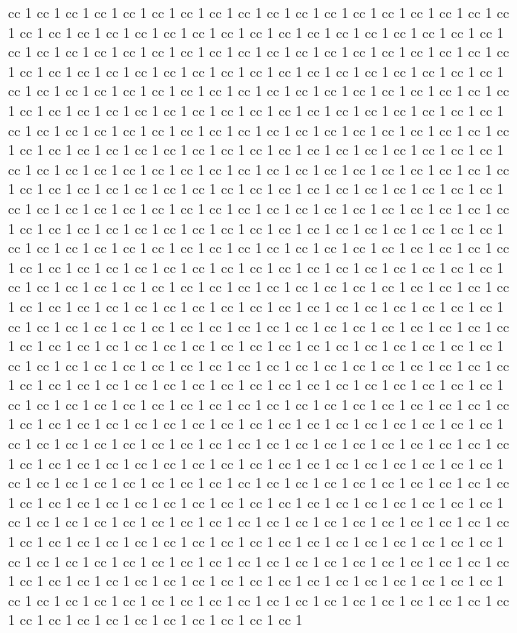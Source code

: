 \documentclass[11pt]{article}
\begin{document}
\begin{itemize}
 cc 1  cc 1  cc 1  cc 1  cc 1  cc 1  cc 1  cc 1  cc 1  cc 1  cc 1  cc 1  cc 1  cc 1  cc 1  cc 1  cc 1  cc 1  cc 1  cc 1  cc 1  cc 1  cc 1  cc 1  cc 1  cc 1  cc 1  cc 1  cc 1  cc 1  cc 1  cc 1  cc 1  cc 1  cc 1  cc 1  cc 1  cc 1  cc 1  cc 1  cc 1  cc 1  cc 1  cc 1  cc 1  cc 1  cc 1  cc 1  cc 1  cc 1  cc 1  cc 1  cc 1  cc 1  cc 1  cc 1  cc 1  cc 1  cc 1  cc 1  cc 1  cc 1  cc 1  cc 1  cc 1  cc 1  cc 1  cc 1  cc 1  cc 1  cc 1  cc 1  cc 1  cc 1  cc 1  cc 1  cc 1  cc 1  cc 1  cc 1  cc 1  cc 1  cc 1  cc 1  cc 1  cc 1  cc 1  cc 1  cc 1  cc 1  cc 1  cc 1  cc 1  cc 1  cc 1  cc 1  cc 1  cc 1  cc 1  cc 1  cc 1  cc 1  cc 1  cc 1  cc 1  cc 1  cc 1  cc 1  cc 1  cc 1  cc 1  cc 1  cc 1  cc 1  cc 1  cc 1  cc 1  cc 1  cc 1  cc 1  cc 1  cc 1  cc 1  cc 1  cc 1  cc 1  cc 1  cc 1  cc 1  cc 1  cc 1  cc 1  cc 1  cc 1  cc 1  cc 1  cc 1  cc 1  cc 1  cc 1  cc 1  cc 1  cc 1  cc 1  cc 1  cc 1  cc 1  cc 1  cc 1  cc 1  cc 1  cc 1  cc 1  cc 1  cc 1  cc 1  cc 1  cc 1  cc 1  cc 1  cc 1  cc 1  cc 1  cc 1  cc 1  cc 1  cc 1  cc 1  cc 1  cc 1  cc 1  cc 1  cc 1  cc 1  cc 1  cc 1  cc 1  cc 1  cc 1  cc 1  cc 1  cc 1  cc 1  cc 1  cc 1  cc 1  cc 1  cc 1  cc 1  cc 1  cc 1  cc 1  cc 1  cc 1  cc 1  cc 1  cc 1  cc 1  cc 1  cc 1  cc 1  cc 1  cc 1  cc 1  cc 1  cc 1  cc 1  cc 1  cc 1  cc 1  cc 1  cc 1  cc 1  cc 1  cc 1  cc 1  cc 1  cc 1  cc 1  cc 1  cc 1  cc 1  cc 1  cc 1  cc 1  cc 1  cc 1  cc 1  cc 1  cc 1  cc 1  cc 1  cc 1  cc 1  cc 1  cc 1  cc 1  cc 1  cc 1  cc 1  cc 1  cc 1  cc 1  cc 1  cc 1  cc 1  cc 1  cc 1  cc 1  cc 1  cc 1  cc 1  cc 1  cc 1  cc 1  cc 1  cc 1  cc 1  cc 1  cc 1  cc 1  cc 1  cc 1  cc 1  cc 1  cc 1  cc 1  cc 1  cc 1  cc 1  cc 1  cc 1  cc 1  cc 1  cc 1  cc 1  cc 1  cc 1  cc 1  cc 1  cc 1  cc 1  cc 1  cc 1  cc 1  cc 1  cc 1  cc 1  cc 1  cc 1  cc 1  cc 1  cc 1  cc 1  cc 1  cc 1  cc 1  cc 1  cc 1  cc 1  cc 1  cc 1  cc 1  cc 1  cc 1  cc 1  cc 1  cc 1  cc 1  cc 1  cc 1  cc 1  cc 1  cc 1  cc 1  cc 1  cc 1  cc 1  cc 1  cc 1  cc 1  cc 1  cc 1  cc 1  cc 1  cc 1  cc 1  cc 1  cc 1  cc 1  cc 1  cc 1  cc 1  cc 1  cc 1  cc 1  cc 1  cc 1  cc 1  cc 1  cc 1  cc 1  cc 1  cc 1  cc 1  cc 1  cc 1  cc 1  cc 1  cc 1  cc 1  cc 1  cc 1  cc 1  cc 1  cc 1  cc 1  cc 1  cc 1  cc 1  cc 1  cc 1  cc 1  cc 1  cc 1  cc 1  cc 1  cc 1  cc 1  cc 1  cc 1  cc 1  cc 1  cc 1  cc 1  cc 1  cc 1  cc 1  cc 1  cc 1  cc 1  cc 1  cc 1  cc 1  cc 1  cc 1  cc 1  cc 1  cc 1  cc 1  cc 1  cc 1  cc 1  cc 1  cc 1  cc 1  cc 1  cc 1  cc 1  cc 1  cc 1  cc 1  cc 1  cc 1  cc 1  cc 1  cc 1  cc 1  cc 1  cc 1  cc 1  cc 1  cc 1  cc 1  cc 1  cc 1  cc 1  cc 1  cc 1  cc 1  cc 1  cc 1  cc 1  cc 1  cc 1  cc 1  cc 1  cc 1  cc 1  cc 1  cc 1  cc 1  cc 1  cc 1  cc 1  cc 1  cc 1  cc 1  cc 1  cc 1  cc 1  cc 1  cc 1  cc 1  cc 1  cc 1  cc 1  cc 1  cc 1  cc 1  cc 1  cc 1  cc 1  cc 1  cc 1  cc 1  cc 1  cc 1  cc 1  cc 1  cc 1  cc 1  cc 1  cc 1  cc 1  cc 1  cc 1  cc 1  cc 1  cc 1  cc 1  cc 1  cc 1  cc 1  cc 1  cc 1  cc 1  cc 1  cc 1  cc 1  cc 1  cc 1  cc 1  cc 1  cc 1  cc 1  cc 1  cc 1  cc 1  cc 1  cc 1  cc 1  cc 1  cc 1  cc 1  cc 1  cc 1  cc 1  cc 1  cc 1  cc 1  cc 1  cc 1  cc 1  cc 1  cc 1  cc 1  cc 1  cc 1  cc 1  cc 1  cc 1  cc 1  cc 1  cc 1  cc 1  cc 1  cc 1  cc 1  cc 1  cc 1  cc 1  cc 1  cc 1  cc 1  cc 1  cc 1  cc 1  cc 1  cc 1  cc 1  cc 1  cc 1  cc 1  cc 1  cc 1  cc 1  cc 1  cc 1  cc 1  cc 1  cc 1  cc 1  cc 1  cc 1  cc 1  cc 1  cc 1  cc 1  cc 1  cc 1  cc 1  cc 1  
\end{itemize}
\end{document}
